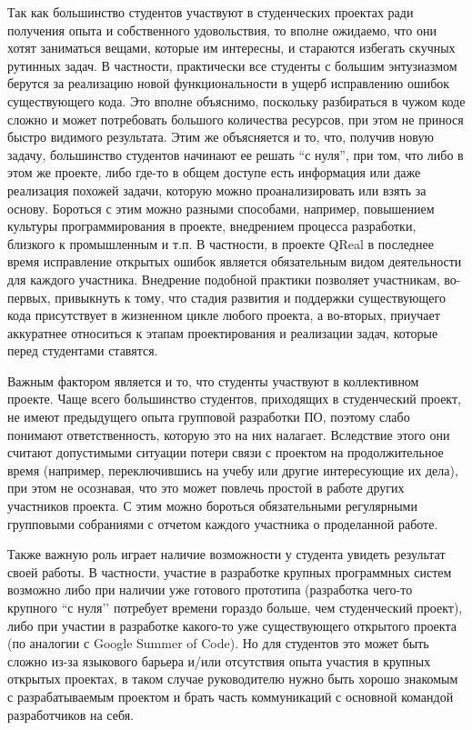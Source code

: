 \documentclass[a4paper]{article}
\begin{document}
Так как большинство студентов участвуют в студенческих проектах ради получения опыта и собственного удовольствия, то вполне ожидаемо, что они хотят заниматься вещами, которые им интересны, и стараются избегать скучных рутинных задач. В частности, практически все студенты  с большим энтузиазмом берутся за реализацию новой функциональности в ущерб исправлению ошибок существующего кода. Это вполне объяснимо, поскольку разбираться в чужом коде сложно и может потребовать большого количества ресурсов, при этом не принося быстро видимого результата. Этим же объясняется и то, что, получив новую задачу, большинство студентов начинают ее решать “с нуля”, при том, что либо в этом же проекте, либо где-то в общем доступе есть информация или даже реализация похожей задачи, которую можно проанализировать или взять за основу. Бороться с этим можно разными способами, например, повышением культуры программирования в проекте, внедрением процесса разработки, близкого к промышленным и т.п. В частности, в проекте QReal в последнее время исправление открытых ошибок является обязательным видом деятельности для каждого участника. Внедрение подобной практики позволяет участникам, во-первых, привыкнуть к тому, что стадия развития и поддержки существующего кода присутствует в жизненном цикле любого проекта, а во-вторых, приучает аккуратнее относиться к этапам проектирования и реализации задач, которые перед студентами ставятся.

Важным фактором является и то, что студенты участвуют в коллективном проекте. Чаще всего большинство студентов, приходящих в студенческий проект, не имеют предыдущего опыта групповой разработки ПО, поэтому слабо понимают ответственность, которую это на них налагает. Вследствие этого они считают допустимыми ситуации потери связи с проектом на продолжительное время (например, переключившись на учебу или другие интересующие их дела), при этом не осознавая, что это может повлечь простой в работе других участников проекта. С этим можно бороться обязательными регулярными групповыми собраниями с отчетом каждого участника о проделанной работе. 

Также важную роль играет наличие возможности у студента увидеть результат своей работы. В частности, участие в разработке крупных программных систем возможно либо при наличии уже готового прототипа (разработка чего-то крупного ``с нуля’’ потребует времени гораздо больше, чем студенческий проект), либо при участии в разработке какого-то уже существующего открытого проекта (по аналогии с Google Summer of Code). Но для студентов это может быть сложно из-за языкового барьера и/или отсутствия опыта участия в крупных открытых проектах, в таком случае руководителю нужно быть хорошо знакомым с разрабатываемым проектом и брать часть коммуникаций с основной командой разработчиков на себя. 
\end{document}
